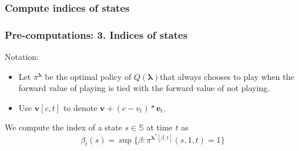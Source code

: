\documentclass{beamer}
\newcommand{\betav}{\pmb{\beta}}
\newcommand{\lambdav}{\pmb{\lambda}}
\newcommand{\substates}{\mathbb{S}}
\newcommand{\substate}{s}
\newcommand{\subactions}{\mathbb{A}}
\newcommand{\subaction}{a}
\begin{document}
\subsubsection{Compute indices of states}
%
%

\begin{frame}[plain]
\frametitle{Pre-computations: 3. Indices of states}
Notation:
\begin{itemize}
\item Let $\pi^{\lambdav}$ be the optimal policy of $Q(\lambdav) $that always chooses to play when the forward value of playing is tied with the forward value of not playing.

\item Use $\mathbf{v}[c,t]$ to denote $\mathbf{v}+(c-v_t)*\mathbf{e}_t$.

\end{itemize}

\vspace{0.3cm}
We compute the index of a state $\substate\in\substates$ at time $t$ as
\begin{equation}
\beta_t(s) = \sup\{\beta: \pi^{\lambdav^*[\beta,t]}(s,1,t)=1\}
\end{equation}

\vspace{0.5cm}

\end{frame}
\end{document}
